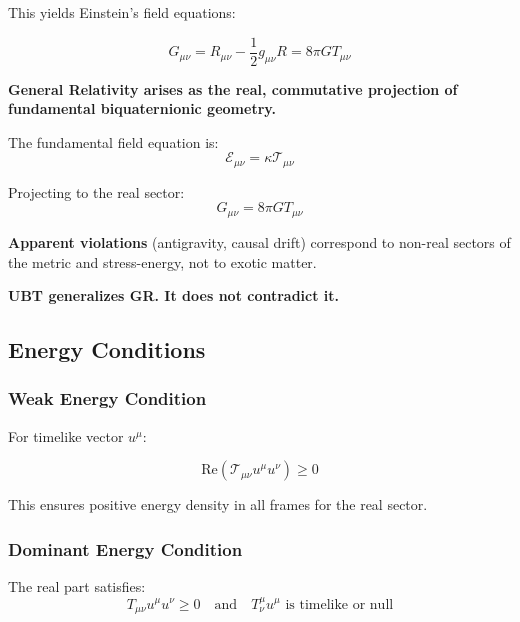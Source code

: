 This yields Einstein's field equations:

\begin{equation}
\label{eq:canonical:einstein_from_stress}
\boxed{G_{\mu\nu} = R_{\mu\nu} - \frac{1}{2} g_{\mu\nu} R = 8\pi G T_{\mu\nu}}
\end{equation}

\begin{tcolorbox}[colback=blue!5!white,colframe=blue!75!black,title=General Relativity as Real Projection]
\textbf{General Relativity arises as the real, commutative projection of fundamental biquaternionic geometry.}

The fundamental field equation is:
\begin{equation}
\mathcal{E}_{\mu\nu} = \kappa \mathcal{T}_{\mu\nu}
\end{equation}

Projecting to the real sector:
\begin{equation}
G_{\mu\nu} = 8\pi G T_{\mu\nu}
\end{equation}

\textbf{Apparent violations} (antigravity, causal drift) correspond to non-real sectors of the metric and stress-energy, not to exotic matter.

\textbf{UBT generalizes GR. It does not contradict it.}
\end{tcolorbox}

\subsection{Energy Conditions}

\subsubsection{Weak Energy Condition}

For timelike vector $u^\mu$:

\begin{equation}
\text{Re}(\mathcal{T}_{\mu\nu} u^\mu u^\nu) \geq 0
\end{equation}

This ensures positive energy density in all frames for the real sector.

\subsubsection{Dominant Energy Condition}

The real part satisfies:
\begin{equation}
T_{\mu\nu} u^\mu u^\nu \geq 0 \quad \text{and} \quad T^\mu_\nu u^\mu \text{ is timelike or null}
\end{equation}

